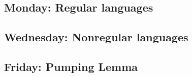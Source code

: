 \subsection*{Monday: Regular languages}



\newpage
\subsection*{Wednesday: Nonregular languages}



\newpage
\subsection*{Friday: Pumping Lemma}



